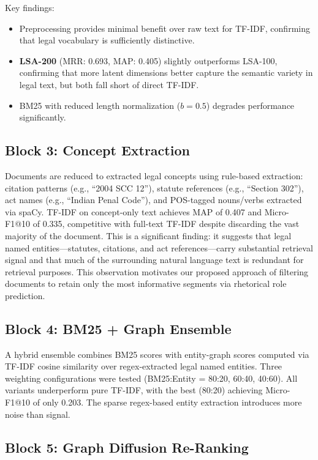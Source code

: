 \documentclass[11pt]{article}
\begin{document}
Key findings:
\begin{itemize}
    \item Preprocessing provides minimal benefit over raw text for TF-IDF, confirming that legal vocabulary is sufficiently distinctive.
    \item \textbf{LSA-200} (MRR: 0.693, MAP: 0.405) slightly outperforms LSA-100, confirming that more latent dimensions better capture the semantic variety in legal text, but both fall short of direct TF-IDF.
    \item BM25 with reduced length normalization ($b{=}0.5$) degrades performance significantly.
\end{itemize}

\subsection{Block 3: Concept Extraction}

Documents are reduced to extracted legal concepts using rule-based extraction: citation patterns (e.g., ``2004 SCC 12''), statute references (e.g., ``Section 302''), act names (e.g., ``Indian Penal Code''), and POS-tagged nouns/verbs extracted via spaCy.
TF-IDF on concept-only text achieves MAP of 0.407 and Micro-F1@10 of 0.335, competitive with full-text TF-IDF despite discarding the vast majority of the document.
This is a significant finding: it suggests that legal named entities---statutes, citations, and act references---carry substantial retrieval signal and that much of the surrounding natural language text is redundant for retrieval purposes.
This observation motivates our proposed approach of filtering documents to retain only the most informative segments via rhetorical role prediction.

\subsection{Block 4: BM25 + Graph Ensemble}

A hybrid ensemble combines BM25 scores with entity-graph scores computed via TF-IDF cosine similarity over regex-extracted legal named entities.
Three weighting configurations were tested (BM25:Entity = 80:20, 60:40, 40:60).
All variants underperform pure TF-IDF, with the best (80:20) achieving Micro-F1@10 of only 0.203.
The sparse regex-based entity extraction introduces more noise than signal.

\subsection{Block 5: Graph Diffusion Re-Ranking}
\end{document}
